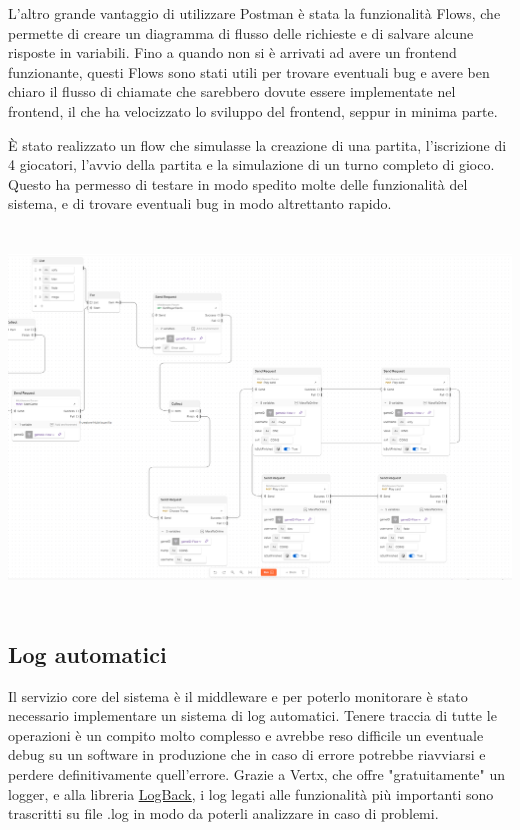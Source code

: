 L'altro grande vantaggio di utilizzare Postman è stata la funzionalità Flows, che permette di creare un diagramma di flusso delle richieste e di salvare alcune risposte in variabili. Fino a quando non si è arrivati ad avere un frontend funzionante, questi Flows sono stati utili per trovare eventuali bug e avere ben chiaro il flusso di chiamate che sarebbero dovute essere implementate nel frontend, il che ha velocizzato lo sviluppo del frontend, seppur in minima parte.

È stato realizzato un flow che simulasse la creazione di una partita, l'iscrizione di 4 giocatori, l'avvio della partita e la simulazione di un turno completo di gioco. Questo ha permesso di testare in modo spedito molte delle funzionalità del sistema, e di trovare eventuali bug in modo altrettanto rapido.

\includegraphics[width=18cm, height=10cm]{report/img/postManFlow.png}\\[7.5cm]


\subsection{Log automatici}

Il servizio core del sistema è il middleware e per poterlo monitorare è stato necessario implementare un sistema di log automatici. Tenere traccia di tutte le operazioni è un compito molto complesso e avrebbe reso difficile un eventuale debug su un software in produzione che in caso di errore potrebbe riavviarsi e perdere definitivamente quell'errore.
Grazie a Vertx, che offre "gratuitamente" un logger, e alla libreria \href{https://mvnrepository.com/artifact/ch.qos.logback/logback-classic}{\underline{LogBack}}, i log legati alle funzionalità più importanti sono trascritti su file .log in modo da poterli analizzare in caso di problemi.

